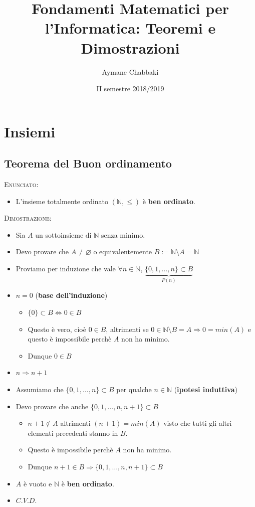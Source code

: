 \documentclass[10pt]{article}
\title{Fondamenti Matematici per l'Informatica: Teoremi e Dimostrazioni}
\author{Aymane Chabbaki}
\date{II semestre 2018/2019}
\begin{document}
\maketitle
\tableofcontents
\newpage
\section{Insiemi}
\subsection{Teorema del Buon ordinamento}
\textsc{Enunciato:}
\begin{itemize}
\item
L'insieme totalmente ordinato $(\mathbb{N}, \leq)$ è \textbf{ben ordinato}.
\end{itemize}
\textsc{Dimostrazione:}
\begin{itemize}
\item
Sia $A$ un sottoinsieme di $\mathbb{N}$ senza minimo. 
\item
Devo provare che $A \neq \varnothing $ o equivalentemente $B := \mathbb{N} \setminus \! A = \mathbb{N}$
\item
Proviamo per induzione che vale $\forall n \!\in\! \mathbb{N}$, $ \underbrace{\{0,1,\dots,n\} \subset B}_{P(n)} $
\item
$n=0$ (\textbf{base dell'induzione})
\begin{itemize}
\item
$\{0\} \subset B \Longleftrightarrow 0 \in B$
\item
Questo è vero, cioè $0 \!\in\! B$, altrimenti se $0 \in \mathbb{N} \setminus \! B = A \Longrightarrow 0 = min(A)$ e questo è impossibile perchè $A$ non ha minimo.
\item
Dunque $0 \!\in\! B$
\end{itemize}
\item
$n \Longrightarrow n+1$
\item
Assumiamo che  $\{0,1,\dots,n\} \subset B$ per qualche $n \!\in \!\mathbb{N}$ (\textbf{ipotesi induttiva})
\item
Devo provare che anche $\{0,1,\dots,n, n+1\} \subset B$
\begin{itemize}
\item
$n+1 \not \in A$ altrimenti $(n+1) = min(A)$ visto che tutti gli altri elementi precedenti stanno in $B$.
\item
Questo è impossibile perchè $A$ non ha minimo.
\item
Dunque $n+1 \in B \Longrightarrow \{0,1,\dots,n, n+1\} \subset B $
\end{itemize}
\item
$A$ è vuoto e $\mathbb{N}$ è \textbf{ben ordinato}.
\item
$C.V.D.$
\end{itemize}
\end{document}
